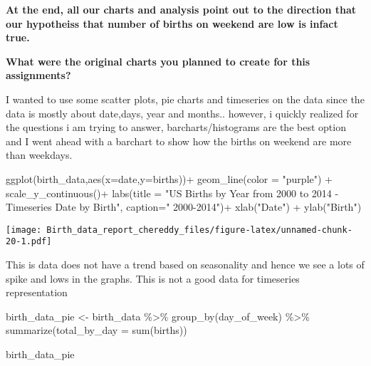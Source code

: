 \documentclass[
]{article}
\newenvironment{Shaded}{\begin{snugshade}}{\end{snugshade}}
\newcommand{\AttributeTok}[1]{\textcolor[rgb]{0.77,0.63,0.00}{#1}}
\newcommand{\FunctionTok}[1]{\textcolor[rgb]{0.00,0.00,0.00}{#1}}
\newcommand{\NormalTok}[1]{#1}
\newcommand{\OtherTok}[1]{\textcolor[rgb]{0.56,0.35,0.01}{#1}}
\newcommand{\SpecialCharTok}[1]{\textcolor[rgb]{0.00,0.00,0.00}{#1}}
\newcommand{\StringTok}[1]{\textcolor[rgb]{0.31,0.60,0.02}{#1}}
\begin{document}
\textbf{At the end, all our charts and analysis point out to the
direction that our hypotheiss that number of births on weekend are low
is infact true.}

\textbf{What were the original charts you planned to create for this
assignments?}

I wanted to use some scatter plots, pie charts and timeseries on the
data since the data is mostly about date,days, year and months..
however, i quickly realized for the questions i am trying to answer,
barcharts/histograms are the best option and I went ahead with a
barchart to show how the births on weekend are more than weekdays.

\begin{Shaded}
\begin{Highlighting}[]
\FunctionTok{ggplot}\NormalTok{(birth\_data,}\FunctionTok{aes}\NormalTok{(}\AttributeTok{x=}\NormalTok{date,}\AttributeTok{y=}\NormalTok{births))}\SpecialCharTok{+}
  \FunctionTok{geom\_line}\NormalTok{(}\AttributeTok{color =} \StringTok{"purple"}\NormalTok{) }\SpecialCharTok{+} 
    \FunctionTok{scale\_y\_continuous}\NormalTok{()}\SpecialCharTok{+}
  \FunctionTok{labs}\NormalTok{(}\AttributeTok{title =} \StringTok{"US Births by Year from 2000 to 2014 {-} Timeseries Date by Birth"}\NormalTok{,}
       \AttributeTok{caption=}\StringTok{" 2000{-}2014"}\NormalTok{)}\SpecialCharTok{+}
  \FunctionTok{xlab}\NormalTok{(}\StringTok{"Date"}\NormalTok{) }\SpecialCharTok{+}
  \FunctionTok{ylab}\NormalTok{(}\StringTok{"Birth"}\NormalTok{)}
\end{Highlighting}
\end{Shaded}

\texttt{[image: Birth\_data\_report\_chereddy\_files/figure-latex/unnamed-chunk-20-1.pdf]}

This is data does not have a trend based on seasonality and hence we see
a lots of spike and lows in the graphs. This is not a good data for
timeseries representation

\begin{Shaded}
\begin{Highlighting}[]
\NormalTok{birth\_data\_pie }\OtherTok{\textless{}{-}}\NormalTok{ birth\_data }\SpecialCharTok{\%\textgreater{}\%} 
  \FunctionTok{group\_by}\NormalTok{(day\_of\_week) }\SpecialCharTok{\%\textgreater{}\%} 
  \FunctionTok{summarize}\NormalTok{(}\AttributeTok{total\_by\_day =} \FunctionTok{sum}\NormalTok{(births))}

\NormalTok{birth\_data\_pie}
\end{Highlighting}
\end{Shaded}
\end{document}
